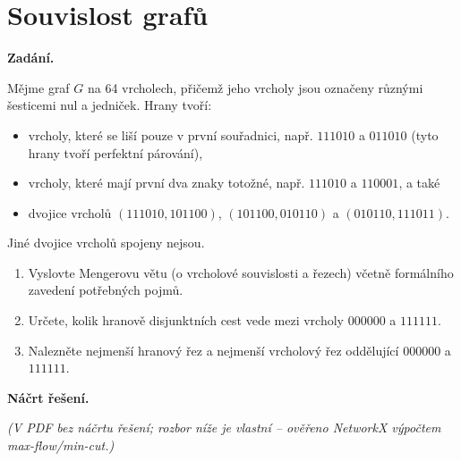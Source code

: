 \section{Souvislost grafů}

\noindent\textbf{Zadání.}\par
Mějme graf $G$ na 64 vrcholech, přičemž jeho vrcholy jsou označeny různými šesticemi nul a jedniček. Hrany tvoří:
\begin{itemize}
  \item vrcholy, které se liší pouze v první souřadnici, např. $111010$ a $011010$ (tyto hrany tvoří perfektní párování),
  \item vrcholy, které mají první dva znaky totožné, např. $111010$ a $110001$, a také
  \item dvojice vrcholů $(111010, 101100)$, $(101100, 010110)$ a $(010110, 111011)$.
\end{itemize}
Jiné dvojice vrcholů spojeny nejsou.

\begin{enumerate}
  \item Vyslovte Mengerovu větu (o vrcholové souvislosti a řezech) včetně formálního zavedení potřebných pojmů.
  \item Určete, kolik hranově disjunktních cest vede mezi vrcholy $000000$ a $111111$.
  \item Nalezněte nejmenší hranový řez a nejmenší vrcholový řez oddělující $000000$ a $111111$.
\end{enumerate}

\medskip
\noindent\textbf{Náčrt řešení.}\par
\textit{(V PDF bez náčrtu řešení; rozbor níže je vlastní -- ověřeno NetworkX výpočtem max-flow/min-cut.)}

